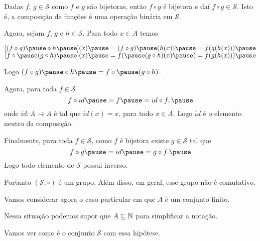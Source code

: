 \documentclass{beamer}
\begin{document}
    \begin{frame}
        Dadas $f$, $g \in \mathcal{S}$ \pause como $f$ e $g$ são bijetoras, \pause então $f \circ g$ é bijetora \pause e daí $f \circ g \in \mathcal{S}$. \pause Isto é, \pause a composição de funções \pause é uma operação binária em $\mathcal{S}$.

        \vspace{.3cm}

        Agora, sejam $f$, $g$ e $h \in \mathcal{S}$. \pause Para todo $x \in A$ temos\pause
        \begin{center}
            $[(f\circ g) \pause \circ h \pause](x) \pause = (f \circ g) \pause(h(x)) \pause = f(g(h(x))) \pause$\\
            $[f\circ \pause(g\circ h) \pause](x) \pause = f( \pause(g\circ h)(x) \pause) = f(g(h(x))) \pause$
        \end{center}

        Logo $(f\circ g) \pause \circ h  \pause = f\circ \pause (g\circ h)$. \pause

        \vspace{.3cm}

        Agora, para toda $f \in \mathcal{S}$\pause
        \[
        f\circ id  \pause = f  \pause = id\circ f, \pause
        \]
        onde $id : A \to A$ \pause é tal que $id(x) = x$, \pause para todo $x \in A$. \pause Logo $id$ é o elemento neutro da composição.\pause

    \end{frame}

    \begin{frame}

        Finalmente, \pause para toda $f \in \mathcal{S}$, \pause como $f$ é bijetora \pause existe $g \in \mathcal{S}$ \pause tal que \pause
        \[
        f\circ g \pause = id \pause = g \circ f. \pause
        \]
        Logo todo elemento de $\mathcal{S}$ \pause possui inverso. \pause

        \vspace{.3cm}

        Portanto $(\mathcal{S}, \circ)$ \pause é um grupo. \pause Além disso, em geral, esse grupo não é comutativo. \pause

        \vspace{.3cm}

        Vamos considerar agora o caso particular \pause em que $A$ é um conjunto finito. \pause

        \vspace{.3cm}

        Nessa situação podemos supor que $A \subseteq \mathbb{N}$ \pause para simplificar a notação. \pause

        \vspace{.3cm}

        Vamos ver como é o conjunto $\mathcal{S}$ com essa hip\'otese. \pause
    \end{frame}
\end{document}
